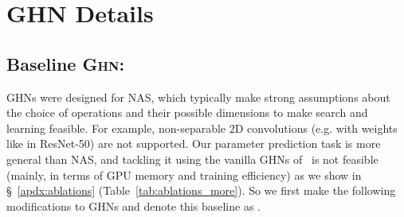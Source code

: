 \section{GHN Details\label{apdx:ghn_bg}}

\subsection{Baseline \textsc{Ghn}: \ghnbase\label{apdx:ghn_1}}

GHNs were designed for NAS, which typically make strong assumptions about the choice of operations and their possible dimensions to make search and learning feasible. For example, non-separable 2D convolutions (e.g. with weights like  in ResNet-50) are not supported. Our parameter prediction task is more general than NAS, and tackling it using the vanilla GHNs of~\cite{zhang2018graph} is not feasible (mainly, in terms of GPU memory and training efficiency) as we show in \S~\ref{apdx:ablations} (Table~\ref{tab:ablations_more}). So we first make the following modifications to GHNs and denote this baseline as \ghnbase.


